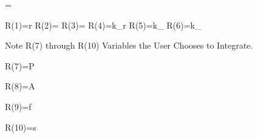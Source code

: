 \documentclass[11pt]{article} %
\begin{document}
\equation
{}=
\endequation

 \equation
 R(1)=r
\endequation
\equation
 R(2)=\theta
\endequation
\equation
 R(3)=\varphi
\endequation
\equation
 R(4)=k_r
\endequation
\equation
 R(5)=k_\theta
\endequation
\equation
 R(6)=k_\varphi
\endequation


Note R(7) through R(10) Variables  the User Chooses to Integrate.

\equation
 R(7)=P 
\endequation

\equation
 R(8)=A 
\endequation

\equation
 R(9)=\Delta f  
\endequation

\equation
 R(10)=s 
\endequation


 
\end{document}
